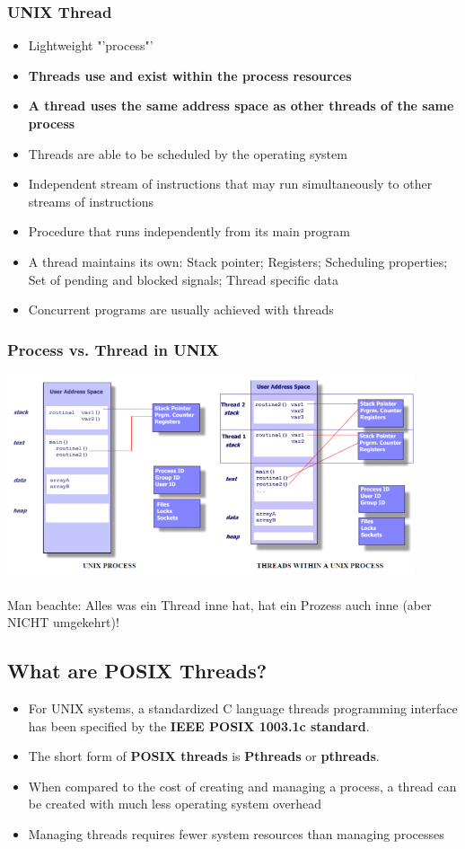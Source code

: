 \subsubsection{UNIX Thread}
\begin{itemize}
  \item Lightweight "'process"'
  \item \textbf{Threads use and exist within the process resources}
  \item \textbf{A thread uses the same address space as other threads of the same process}
  \item Threads are able to be scheduled by the operating system
  \item Independent stream of instructions that may run simultaneously to other streams of instructions
  \item Procedure that runs independently from its main program
  \item A thread maintains its own: Stack pointer; Registers; Scheduling properties; Set of pending and blocked signals; Thread specific data
  \item Concurrent programs are usually achieved with threads
\end{itemize}

\subsubsection{Process vs. Thread in UNIX}
\includegraphics[width=12cm]{images/Concurrency/ProcessVsThread.png}\\\\
Man beachte: Alles was ein Thread inne hat, hat ein Prozess auch inne (aber NICHT umgekehrt)!

\subsection{What are POSIX Threads?}
\begin{itemize}
  \item For UNIX systems, a standardized C language threads programming interface has been specified by the \textbf{IEEE POSIX 1003.1c standard}.
  \item The short form of \textbf{POSIX threads} is \textbf{Pthreads} or \textbf{pthreads}.
  \item When compared to the cost of creating and managing a process, a thread can be created with much less operating system overhead
  \item Managing threads requires fewer system resources than managing processes
\end{itemize}


